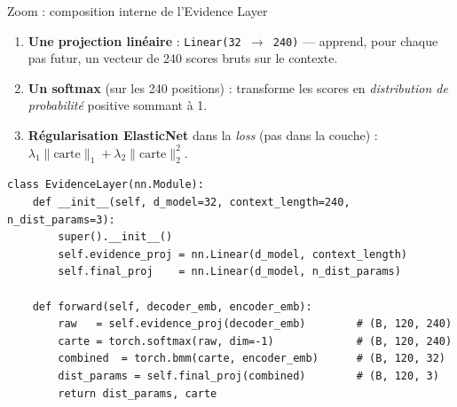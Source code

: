 \documentclass[10pt]{beamer}
\begin{document}
\begin{frame}[fragile]{Zoom : composition interne de l'Evidence Layer}
  \begin{tcolorbox}[colback=blue!3, colframe=blue!50!black, arc=3mm, fonttitle=\bfseries,
                    title=L'Evidence Layer en 3 ingrédients]
    \begin{enumerate}
      \item \textbf{Une projection linéaire} : \texttt{Linear(32 $\to$ 240)} — apprend, pour chaque pas futur, un vecteur de 240 scores bruts sur le contexte.
      \item \textbf{Un softmax} (sur les 240 positions) : transforme les scores en \emph{distribution de probabilité} positive sommant à 1.
      \item \textbf{Régularisation ElasticNet} dans la \emph{loss} (pas dans la couche) : $\lambda_1 \|\text{carte}\|_1 + \lambda_2 \|\text{carte}\|_2^2$.
    \end{enumerate}
  \end{tcolorbox}

  \vspace{2pt}

  \begin{tcolorbox}[colback=gray!3, colframe=gray!60!black, arc=2mm, fonttitle=\bfseries,
                    title=PyTorch — version minimaliste]
    \tiny
\begin{verbatim}
class EvidenceLayer(nn.Module):
    def __init__(self, d_model=32, context_length=240, n_dist_params=3):
        super().__init__()
        self.evidence_proj = nn.Linear(d_model, context_length)
        self.final_proj    = nn.Linear(d_model, n_dist_params)

    def forward(self, decoder_emb, encoder_emb):
        raw   = self.evidence_proj(decoder_emb)        # (B, 120, 240)
        carte = torch.softmax(raw, dim=-1)             # (B, 120, 240)
        combined  = torch.bmm(carte, encoder_emb)      # (B, 120, 32)
        dist_params = self.final_proj(combined)        # (B, 120, 3)
        return dist_params, carte
\end{verbatim}
  \end{tcolorbox}
\end{frame}
\end{document}
